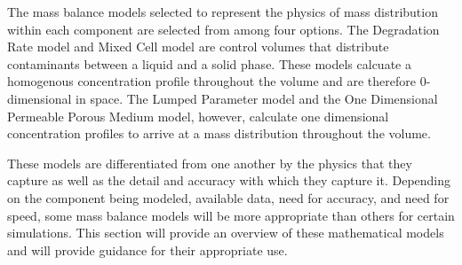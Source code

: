 The mass balance models selected to represent the physics of mass distribution 
within each component are selected from among four options. The Degradation Rate 
model and Mixed Cell model are control volumes that distribute contaminants 
between a liquid and a solid phase. These models calcuate a homogenous 
concentration profile throughout the volume and are therefore
0-dimensional in space. The Lumped Parameter model and the One Dimensional 
Permeable Porous Medium model, however, calculate one dimensional concentration 
profiles to arrive at a mass distribution throughout the volume. 

These models are differentiated from one another by the physics that they 
capture as well as the detail and accuracy with which they capture it.  
Depending on the component being modeled, available data, need for 
accuracy, and need for speed, some mass balance models will be more appropriate 
than others for certain simulations. This section will provide an overview of 
these mathematical models and will provide guidance for their appropriate use.
